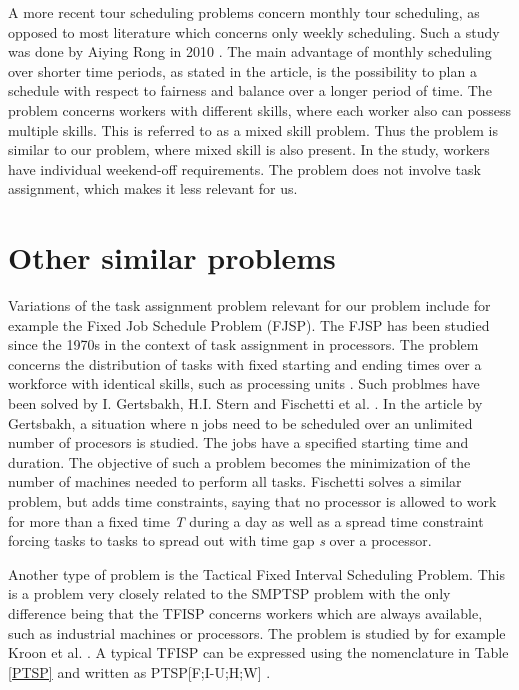 A more recent tour scheduling problems concern monthly tour scheduling, as opposed to most literature which concerns only weekly scheduling. Such a study was done by Aiying Rong in 2010 \cite{rong_2010}. The main advantage of monthly scheduling over shorter time periods, as stated in the article, is the possibility to plan a schedule with respect to fairness and balance over a longer period of time. The problem concerns workers with different skills, where each worker also can possess multiple skills. This is referred to as a mixed skill problem. Thus the problem is similar to our problem, where mixed skill is also present. In the study, workers have individual weekend-off requirements. The problem does not involve task assignment, which makes it less relevant for us.

\section{Other similar problems}\label{other}

Variations of the task assignment problem relevant for our problem include for example the Fixed Job Schedule Problem (FJSP). The FJSP has been studied since the 1970s in the context of task assignment in processors. The problem concerns the distribution of tasks with fixed starting and ending times over a workforce with identical skills, such as processing units \cite{krishnamoorthy_2011}. Such problmes have been solved by I. Gertsbakh, H.I. Stern \cite{Gertsbakh_1977} and Fischetti et al. \cite{fischetti_1992}. In the article by Gertsbakh, a situation where n jobs need to be scheduled over an unlimited number of procesors is studied. The jobs have a specified starting time and duration. The objective of such a problem becomes the minimization of the number of machines needed to perform all tasks. Fischetti solves a similar problem, but adds time constraints, saying that no processor is allowed to work for more than a fixed time \textit{T} during a day as well as a spread time constraint forcing tasks to tasks to spread out with time gap \textit{s} over a processor.	

Another type of problem is the Tactical Fixed Interval Scheduling Problem. This is a problem very closely related to the SMPTSP problem with the only difference being that the TFISP concerns workers which are always available, such as industrial machines or processors. The problem is studied by for example Kroon et al. \cite{kroon_1997}. A typical TFISP can be expressed using the nomenclature in Table \ref{PTSP} and written as PTSP[F;I-U;H;W] \cite{krishnamoorthy_2001}.

